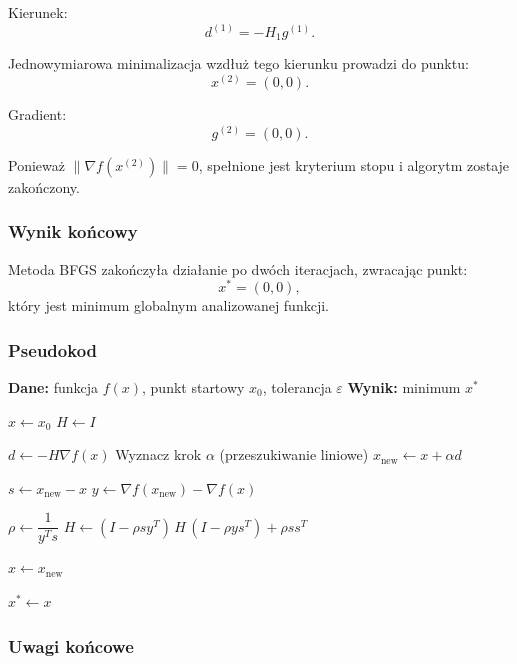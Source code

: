 \documentclass[10pt,a4paper]{article}
\begin{document}
Kierunek:
\[
d^{(1)} = -H_1 g^{(1)}.
\]

Jednowymiarowa minimalizacja wzdłuż tego kierunku prowadzi do punktu:
\[
x^{(2)} = (0,0).
\]

Gradient:
\[
g^{(2)} = (0,0).
\]

Ponieważ $\|\nabla f(x^{(2)})\| = 0$, spełnione jest kryterium stopu
i algorytm zostaje zakończony.



\subsubsection{Wynik końcowy}

Metoda BFGS zakończyła działanie po dwóch iteracjach,
zwracając punkt:
\[
x^\ast = (0,0),
\]
który jest minimum globalnym analizowanej funkcji.

\subsubsection{Pseudokod}

\begin{algorithm}[H]
\caption{Metoda BFGS (postać zwarta – aktualizacja Shermana--Morrisona)}
\begin{algorithmic}[1]
\STATE \textbf{Dane:} funkcja $f(x)$, punkt startowy $x_0$, tolerancja $\varepsilon$
\STATE \textbf{Wynik:} minimum $x^\ast$

\STATE $x \leftarrow x_0$
\STATE $H \leftarrow I$ 

    \STATE $d \leftarrow - H \nabla f(x)$
    \STATE Wyznacz krok $\alpha$ (przeszukiwanie liniowe)
    \STATE $x_{\text{new}} \leftarrow x + \alpha d$

    \STATE $s \leftarrow x_{\text{new}} - x$
    \STATE $y \leftarrow \nabla f(x_{\text{new}}) - \nabla f(x)$

    \STATE $\rho \leftarrow \dfrac{1}{y^{T} s}$
    \STATE $H \leftarrow (I - \rho s y^{T})\, H\, (I - \rho y s^{T}) + \rho s s^{T}$

    \STATE $x \leftarrow x_{\text{new}}$
\ENDWHILE

\STATE $x^\ast \leftarrow x$
\end{algorithmic}
\end{algorithm}


\subsubsection{Uwagi końcowe}
\end{document}

